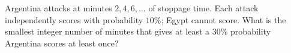 Argentina attacks at minutes $2,4,6,\ldots$ of stoppage time. Each attack independently scores with probability $10\%$; Egypt cannot score. What is the smallest integer number of minutes that gives at least a $30\%$ probability Argentina scores at least once?
